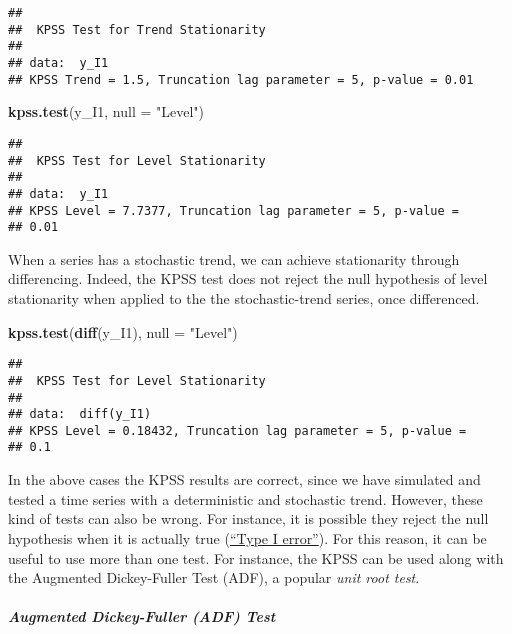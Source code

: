 \documentclass[
]{article}
\newenvironment{Shaded}{\begin{snugshade}}{\end{snugshade}}
\newcommand{\AttributeTok}[1]{\textcolor[rgb]{0.13,0.29,0.53}{#1}}
\newcommand{\FunctionTok}[1]{\textcolor[rgb]{0.13,0.29,0.53}{\textbf{#1}}}
\newcommand{\NormalTok}[1]{#1}
\newcommand{\StringTok}[1]{\textcolor[rgb]{0.31,0.60,0.02}{#1}}
\begin{document}
\begin{verbatim}
## 
##  KPSS Test for Trend Stationarity
## 
## data:  y_I1
## KPSS Trend = 1.5, Truncation lag parameter = 5, p-value = 0.01
\end{verbatim}

\begin{Shaded}
\begin{Highlighting}[]
\FunctionTok{kpss.test}\NormalTok{(y\_I1, }\AttributeTok{null =} \StringTok{"Level"}\NormalTok{)}
\end{Highlighting}
\end{Shaded}

\begin{verbatim}
## 
##  KPSS Test for Level Stationarity
## 
## data:  y_I1
## KPSS Level = 7.7377, Truncation lag parameter = 5, p-value =
## 0.01
\end{verbatim}

When a series has a stochastic trend, we can achieve stationarity through differencing. Indeed, the KPSS test does not reject the null hypothesis of level stationarity when applied to the the stochastic-trend series, once differenced.

\begin{Shaded}
\begin{Highlighting}[]
\FunctionTok{kpss.test}\NormalTok{(}\FunctionTok{diff}\NormalTok{(y\_I1), }\AttributeTok{null =} \StringTok{"Level"}\NormalTok{)}
\end{Highlighting}
\end{Shaded}

\begin{verbatim}
## 
##  KPSS Test for Level Stationarity
## 
## data:  diff(y_I1)
## KPSS Level = 0.18432, Truncation lag parameter = 5, p-value =
## 0.1
\end{verbatim}

In the above cases the KPSS results are correct, since we have simulated and tested a time series with a deterministic and stochastic trend. However, these kind of tests can also be wrong. For instance, it is possible they reject the null hypothesis when it is actually true (\href{https://en.wikipedia.org/wiki/Type_I_and_type_II_errors}{``Type I error''}). For this reason, it can be useful to use more than one test. For instance, the KPSS can be used along with the Augmented Dickey-Fuller Test (ADF), a popular \emph{unit root test}.

\subparagraph{Augmented Dickey-Fuller (ADF) Test}\label{augmented-dickey-fuller-adf-test}
\end{document}
